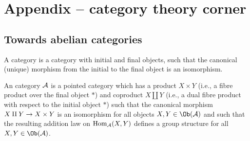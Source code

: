 \documentclass[a4paper,parskip=half,numbers=enddot, DIV=12]{scrreprt}
\begin{document}
\appendix
\chapter{Appendix -- category theory corner}
\setcounter{thm}{0}
\renewcommand*{\thethm}{\Alph{thm}}
\section{Towards abelian categories}
\begin{defi}
	\begin{alphanumerate}
		\item {}A  category is a category with initial and final objects, such that the canonical (unique) morphism from the initial to the final object is an isomorphism.
		\item An  category $\mathcal{A}$ is a pointed category which has a product $X\times Y$ (i.e., a fibre product over the final object $*$) and coproduct $X\amalg Y$ (i.e., a dual fibre product with respect to the initial object $*$) such that the canonical morphism $X\amalg Y\morphism X\times Y$ is an isomorphism for all objects $X,Y\in\Ob(\Aa)$ and such that the resulting addition law on $\operatorname{Hom}_{\mathcal{A}}(X,Y)$ defines a group structure for all $X,Y\in\Ob(\Aa)$.
	\end{alphanumerate}
\end{defi}
\end{document}
